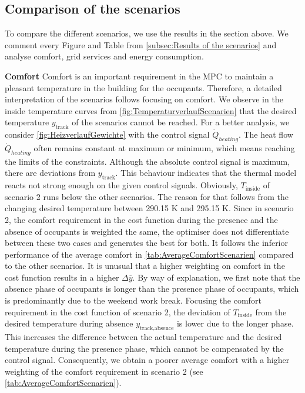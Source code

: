 \subsection{Comparison of the scenarios}
\label{subsec:Comparison fo the scenarios}
To compare the different scenarios, we use the results in the section above. We comment every Figure and Table from \autoref{subsec:Results of the scenarios} and analyse comfort, grid services and energy consumption.\newline

\textbf{Comfort}\newline
Comfort is an important requirement in the MPC to maintain a pleasant temperature in the building for the occupants. Therefore, a detailed interpretation of the scenarios follows focusing on comfort.\newline
We observe in the inside temperature curves from \autoref{fig:TemperaturverlaufScenarien} that the desired temperature $y_\text{track}$ of the scenarios cannot be reached. For a better analysis, we consider \autoref{fig:HeizverlaufGewichte} with the control signal $\dot{Q}_{heating}$. The heat flow $\dot{Q}_{heating}$ often remains constant at maximum or minimum, which means reaching the limits of the constraints. Although the absolute control signal is maximum, there are deviations from $y_\text{track}$. This behaviour indicates that the thermal model reacts not strong enough on the given control signals.\newline
Obviously, $T_\text{inside}$ of scenario 2 runs below the other scenarios. The reason for that follows from the changing desired temperature between 290.15 K and 295.15 K. Since in scenario 2, the comfort requirement in the cost function during the presence and the absence of occupants is weighted the same, the optimiser does not differentiate between these two cases and generates the best for both. It follows the inferior performance of the average comfort in \autoref{tab:AverageComfortScenarien} compared to the other scenarios. It is unusual that a higher weighting on comfort in the cost function results in a higher $\Delta \overline{y}$. By way of explanation, we first note that the absence phase of occupants is longer than the presence phase of occupants, which is predominantly due to the weekend work break. Focusing the comfort requirement in the cost function of scenario 2, the deviation of $T_\text{inside}$ from the desired temperature during absence $y_\text{track,absence}$ is lower due to the longer phase. This increases the difference between the actual temperature and the desired temperature during the presence phase, which cannot be compensated by the control signal. Consequently, we obtain a poorer average comfort with a higher weighting of the comfort requirement in scenario 2 (see \autoref{tab:AverageComfortScenarien}).\newline 
